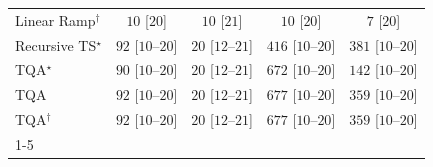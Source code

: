\begin{tabular}{l|cccc|}
Linear Ramp$^\dagger$ & {\cellcolor[HTML]{F6FCF4}} \color[HTML]{000000} $10$ [$20$] & {\cellcolor[HTML]{F6FCF4}} \color[HTML]{000000} $10$ [$21$] & {\cellcolor[HTML]{F6FCF4}} \color[HTML]{000000} $10$ [$20$] & {\cellcolor[HTML]{F6FCF4}} \color[HTML]{000000} $7$ [$20$] \\
Recursive TS$^\star$ & {\cellcolor[HTML]{E7F6E2}} \color[HTML]{000000} $92$ [$10$--$20$] & {\cellcolor[HTML]{F4FBF2}} \color[HTML]{000000} $20$ [$12$--$21$] & {\cellcolor[HTML]{68BE70}} \color[HTML]{000000} $416$ [$10$--$20$] & {\cellcolor[HTML]{79C67A}} \color[HTML]{000000} $381$ [$10$--$20$] \\
TQA$^\star$ & {\cellcolor[HTML]{E7F6E3}} \color[HTML]{000000} $90$ [$10$--$20$] & {\cellcolor[HTML]{F4FBF2}} \color[HTML]{000000} $20$ [$12$--$21$] & {\cellcolor[HTML]{05712F}} \color[HTML]{F1F1F1} $672$ [$10$--$20$] & {\cellcolor[HTML]{D9F0D3}} \color[HTML]{000000} $142$ [$10$--$20$] \\
TQA & {\cellcolor[HTML]{E7F6E2}} \color[HTML]{000000} $92$ [$10$--$20$] & {\cellcolor[HTML]{F4FBF2}} \color[HTML]{000000} $20$ [$12$--$21$] & {\cellcolor[HTML]{03702E}} \color[HTML]{F1F1F1} $677$ [$10$--$20$] & {\cellcolor[HTML]{84CC83}} \color[HTML]{000000} $359$ [$10$--$20$] \\
TQA$^\dagger$ & {\cellcolor[HTML]{E7F6E2}} \color[HTML]{000000} $92$ [$10$--$20$] & {\cellcolor[HTML]{F4FBF2}} \color[HTML]{000000} $20$ [$12$--$21$] & {\cellcolor[HTML]{03702E}} \color[HTML]{F1F1F1} $677$ [$10$--$20$] & {\cellcolor[HTML]{84CC83}} \color[HTML]{000000} $359$ [$10$--$20$] \\
\cline{1-5}
\bottomrule
\end{tabular}
